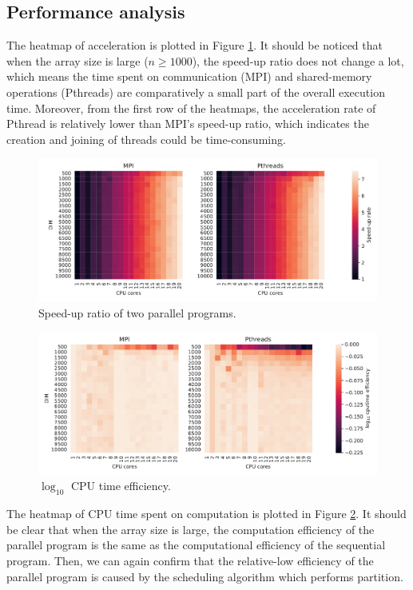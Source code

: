 \documentclass[twoside,12pt]{article}
\theoremstyle{definition}
\theoremstyle{remark}
\begin{document}
\clearpage
\newpage
\subsection{Performance analysis}
The heatmap of acceleration is plotted in Figure \ref{fig:heatmap-rate}.
It should be noticed that when the array size is large ($n\geq 1000$), 
the speed-up ratio does not change a lot,
which means the time spent on communication (MPI) and
shared-memory operations (Pthreads) are comparatively 
a small part of the overall execution time.
Moreover, from the first row of the heatmaps,
the acceleration rate of Pthread is relatively lower than
MPI's speed-up ratio, which indicates the creation and joining
of threads could be time-consuming.

\begin{figure}[h!]
    \centering
    \includegraphics[width=\textwidth]{../analysis/heatmap-rate.pdf}
    \caption{Speed-up ratio of two parallel programs.}
    \label{fig:heatmap-rate}
\end{figure}
\begin{figure}[h!]
    \centering
    \includegraphics[width=\textwidth]{../analysis/heatmap-cpueff.pdf}
    \caption{$\log_10$ CPU time efficiency.}
    \label{fig:heatmap-cpueff}
\end{figure}

The heatmap of CPU time spent on computation is plotted in
Figure \ref{fig:heatmap-cpueff}.
It should be clear that when the array size is large, 
the computation efficiency of the parallel program
is the same as the computational efficiency of the sequential program.
Then, we can again confirm that the relative-low efficiency
of the parallel program is caused by the scheduling algorithm
which performs partition. 
\end{document}
